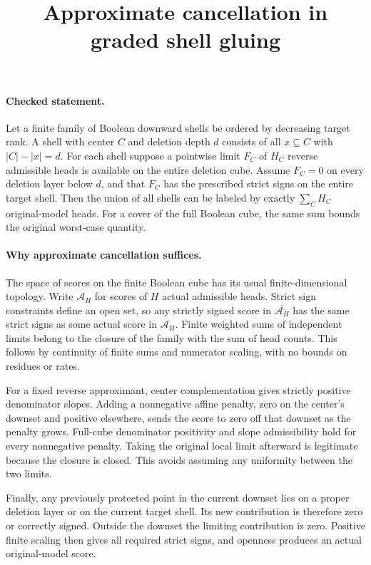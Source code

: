 \documentclass{article}
\begin{document}
\title{Approximate cancellation in graded shell gluing}
\maketitle

\paragraph{Checked statement.}
Let a finite family of Boolean downward shells be ordered by decreasing target
rank. A shell with center $C$ and deletion depth $d$ consists of all $x\subseteq C$
with $|C|-|x|=d$. For each shell suppose a pointwise limit $F_C$ of $H_C$ reverse
admissible heads is available on the entire deletion cube. Assume $F_C=0$ on
every deletion layer below $d$, and that $F_C$ has the prescribed strict signs
on the entire target shell. Then the union of all shells can be labeled by
exactly $\sum_C H_C$ original-model heads. For a cover of the full Boolean cube,
the same sum bounds the original worst-case quantity.

\paragraph{Why approximate cancellation suffices.}
The space of scores on the finite Boolean cube has its usual finite-dimensional
topology. Write $\mathcal A_H$ for scores of $H$ actual admissible heads. Strict
sign constraints define an open set, so any strictly signed score in
$\overline{\mathcal A_H}$ has the same strict signs as some actual score in
$\mathcal A_H$. Finite weighted sums of independent limits belong to the
closure of the family with the sum of head counts. This follows by continuity
of finite sums and numerator scaling, with no bounds on residues or rates.

For a fixed reverse approximant, center complementation gives strictly
positive denominator slopes. Adding a nonnegative affine penalty, zero on the
center's downset and positive elsewhere, sends the score to zero off that
downset as the penalty grows. Full-cube denominator positivity and slope
admissibility hold for every nonnegative penalty. Taking the original local
limit afterward is legitimate because the closure is closed. This avoids
assuming any uniformity between the two limits.

Finally, any previously protected point in the current downset lies on a
proper deletion layer or on the current target shell. Its new contribution is
therefore zero or correctly signed. Outside the downset the limiting
contribution is zero. Positive finite scaling then gives all required strict
signs, and openness produces an actual original-model score.
\end{document}
